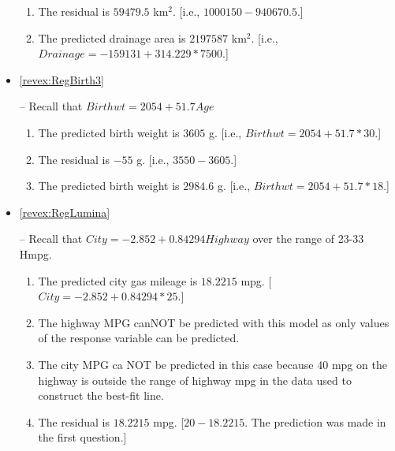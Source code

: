 \documentclass[10pt,openany]{book}\usepackage[]{graphicx}\usepackage[]{color}
\begin{document}
\begin{itemize}
\begin{enumerate}
      \item The residual is $59479.5$ km$^{2}$.  [i.e., $1000150 - 940670.5$.]
      \item The predicted drainage area is $2197587$ km$^{2}$.  [i.e., $Drainage=-159131+314.229*7500$.]
    \end{enumerate}
  \item \hypertarget{ans:RegBirth3}{\ref{revex:RegBirth3}} -- Recall that $Birthwt=2054+51.7Age$
    \begin{enumerate}
      \item The predicted birth weight is $3605$ g.  [i.e., $Birthwt=2054+51.7*30$.]
      \item The residual is $-55$ g.  [i.e., $3550-3605$.]
      \item The predicted birth weight is $2984.6$ g.  [i.e., $Birthwt=2054+51.7*18$.]
    \end{enumerate}

  \item \hypertarget{ans:RegLumina}{\ref{revex:RegLumina}} -- Recall that $City=-2.852+0.84294Highway$ over the range of 23-33 Hmpg.
    \begin{enumerate}
      \item The predicted city gas mileage is $18.2215$ mpg.  [$City = -2.852 + 0.84294*25$.]
      \item The highway MPG canNOT be predicted with this model as only values of the response variable can be predicted.
      \item The city MPG ca NOT be predicted in this case because 40 mpg on the highway is outside the range of highway mpg in the data used to construct the best-fit line.
      \item The residual is $18.2215$ mpg.  [$20-18.2215$.  The prediction was made in the first question.]
    \end{enumerate}


\end{itemize}
\end{document}
